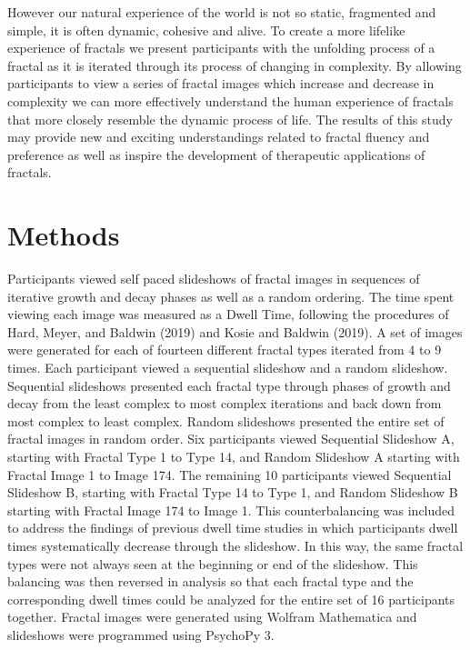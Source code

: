 \documentclass[english,jou]{apa6}
\begin{document}
However our natural experience of the world is not so static, fragmented and simple, it is often dynamic, cohesive and alive. To create a more lifelike experience of fractals we present participants with the unfolding process of a fractal as it is iterated through its process of changing in complexity. By allowing participants to view a series of fractal images which increase and decrease in complexity we can more effectively understand the human experience of fractals that more closely resemble the dynamic process of life. The results of this study may provide new and exciting understandings related to fractal fluency and preference as well as inspire the development of therapeutic applications of fractals.

\hypertarget{methods}{%
\section{Methods}\label{methods}}

Participants viewed self paced slideshows of fractal images in sequences of iterative growth and decay phases as well as a random ordering. The time spent viewing each image was measured as a Dwell Time, following the procedures of Hard, Meyer, and Baldwin (2019) and Kosie and Baldwin (2019). A set of images were generated for each of fourteen different fractal types iterated from 4 to 9 times. Each participant viewed a sequential slideshow and a random slideshow. Sequential slideshows presented each fractal type through phases of growth and decay from the least complex to most complex iterations and back down from most complex to least complex. Random slideshows presented the entire set of fractal images in random order. Six participants viewed Sequential Slideshow A, starting with Fractal Type 1 to Type 14, and Random Slideshow A starting with Fractal Image 1 to Image 174. The remaining 10 participants viewed Sequential Slideshow B, starting with Fractal Type 14 to Type 1, and Random Slideshow B starting with Fractal Image 174 to Image 1. This counterbalancing was included to address the findings of previous dwell time studies in which participants dwell times systematically decrease through the slideshow. In this way, the same fractal types were not always seen at the beginning or end of the slideshow. This balancing was then reversed in analysis so that each fractal type and the corresponding dwell times could be analyzed for the entire set of 16 participants together. Fractal images were generated using Wolfram Mathematica and slideshows were programmed using PsychoPy 3.
\end{document}
